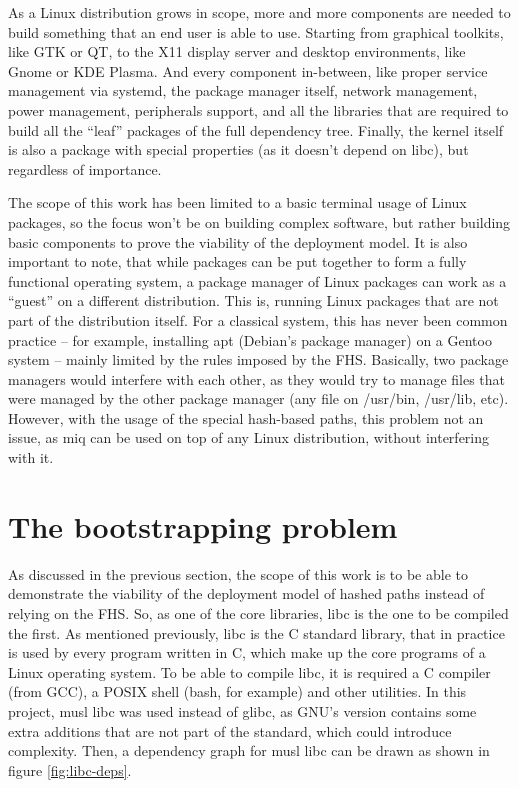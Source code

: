 As a Linux distribution grows in scope, more and more
components are needed to build something that an end user is
able to use. Starting from graphical toolkits, like GTK or
QT, to the X11 display server and desktop environments, like
Gnome or KDE Plasma. And every component in-between, like
proper service management via systemd, the package manager
itself, network management, power management, peripherals
support, and all the libraries that are required to build
all the ``leaf'' packages of the full dependency tree.
Finally, the kernel itself is also a package with special
properties (as it doesn't depend on libc), but regardless of
importance.

The scope of this work has been limited to a basic terminal
usage of Linux packages, so the focus won't be on building
complex software, but rather building basic components to
prove the viability of the deployment model. It is also
important to note, that while packages can be put together
to form a fully functional operating system, a
package manager of Linux packages can work as a ``guest'' on
a different distribution. This is, running Linux packages
that are not part of the distribution itself. For a
classical system, this has never been common practice -- for
example, installing apt (Debian's package manager) on a
Gentoo system -- mainly limited by the rules imposed by the
\acl{FHS}. Basically, two package managers would interfere
with each other, as they would try to manage files that were
managed by the other package manager (any file on /usr/bin,
/usr/lib, etc). However, with the usage of the special
hash-based paths, this problem not an issue, as miq can be
used on top of any Linux distribution, without interfering
with it.

\FloatBarrier
\section{The bootstrapping problem}

As discussed in the previous section, the scope of this work
is to be able to demonstrate the viability of the deployment
model of hashed paths instead of relying on the \ac{FHS}.
So, as one of the core libraries, libc is the one to be
compiled the first. As mentioned previously, libc is the C
standard library, that in practice is used by every program
written in C, which make up the core programs of a Linux
operating system. To be able to compile libc, it is required
a C compiler (from GCC), a POSIX shell (bash, for
example) and other utilities. In this project, musl libc was used instead of
glibc, as GNU's version contains some extra additions that
are not part of the standard, which could introduce
complexity. Then, a dependency graph for musl libc can be
drawn as shown in figure \ref{fig:libc-deps}.

